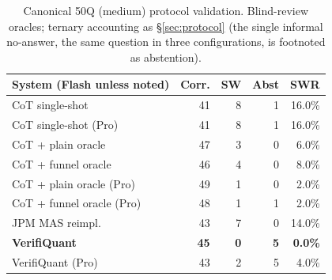 \begin{table}[t]
\caption{Canonical 50Q (medium) protocol validation. Blind-review oracles; ternary accounting as \S\ref{sec:protocol} (the single informal no-answer, the same question in three configurations, is footnoted as abstention).}
\label{tab:fifty}
\small
\begin{tabular}{@{}lrrrr@{}}
\toprule
System (Flash unless noted) & Corr. & SW & Abst & SWR \\
\midrule
CoT single-shot & 41 & 8 & 1 & 16.0\% \\
CoT single-shot (Pro) & 41 & 8 & 1 & 16.0\% \\
CoT + plain oracle & 47 & 3 & 0 & 6.0\% \\
CoT + funnel oracle & 46 & 4 & 0 & 8.0\% \\
CoT + plain oracle (Pro) & 49 & 1 & 0 & 2.0\% \\
CoT + funnel oracle (Pro) & 48 & 1 & 1 & 2.0\% \\
JPM MAS reimpl.\ \cite{kundu2025multiagent} & 43 & 7 & 0 & 14.0\% \\
\textbf{VerifiQuant} & \textbf{45} & \textbf{0} & \textbf{5} & \textbf{0.0\%} \\
VerifiQuant (Pro) & 43 & 2 & 5 & 4.0\% \\
\bottomrule
\end{tabular}
\end{table}
